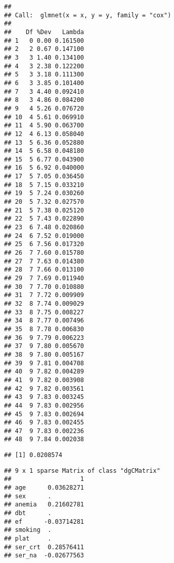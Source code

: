 \documentclass[
]{article}
\newenvironment{Shaded}{\begin{snugshade}}{\end{snugshade}}
\newcommand{\AttributeTok}[1]{\textcolor[rgb]{0.77,0.63,0.00}{#1}}
\newcommand{\FunctionTok}[1]{\textcolor[rgb]{0.00,0.00,0.00}{#1}}
\newcommand{\NormalTok}[1]{#1}
\newcommand{\SpecialCharTok}[1]{\textcolor[rgb]{0.00,0.00,0.00}{#1}}
\begin{document}
\begin{verbatim}
## 
## Call:  glmnet(x = x, y = y, family = "cox") 
## 
##    Df %Dev   Lambda
## 1   0 0.00 0.161500
## 2   2 0.67 0.147100
## 3   3 1.40 0.134100
## 4   3 2.38 0.122200
## 5   3 3.18 0.111300
## 6   3 3.85 0.101400
## 7   3 4.40 0.092410
## 8   3 4.86 0.084200
## 9   4 5.26 0.076720
## 10  4 5.61 0.069910
## 11  4 5.90 0.063700
## 12  4 6.13 0.058040
## 13  5 6.36 0.052880
## 14  5 6.58 0.048180
## 15  5 6.77 0.043900
## 16  5 6.92 0.040000
## 17  5 7.05 0.036450
## 18  5 7.15 0.033210
## 19  5 7.24 0.030260
## 20  5 7.32 0.027570
## 21  5 7.38 0.025120
## 22  5 7.43 0.022890
## 23  6 7.48 0.020860
## 24  6 7.52 0.019000
## 25  6 7.56 0.017320
## 26  7 7.60 0.015780
## 27  7 7.63 0.014380
## 28  7 7.66 0.013100
## 29  7 7.69 0.011940
## 30  7 7.70 0.010880
## 31  7 7.72 0.009909
## 32  8 7.74 0.009029
## 33  8 7.75 0.008227
## 34  8 7.77 0.007496
## 35  8 7.78 0.006830
## 36  9 7.79 0.006223
## 37  9 7.80 0.005670
## 38  9 7.80 0.005167
## 39  9 7.81 0.004708
## 40  9 7.82 0.004289
## 41  9 7.82 0.003908
## 42  9 7.82 0.003561
## 43  9 7.83 0.003245
## 44  9 7.83 0.002956
## 45  9 7.83 0.002694
## 46  9 7.83 0.002455
## 47  9 7.83 0.002236
## 48  9 7.84 0.002038
\end{verbatim}

\begin{Shaded}
\end{Shaded}

\begin{verbatim}
## [1] 0.0208574
\end{verbatim}

\begin{Shaded}
\end{Shaded}

\begin{verbatim}
## 9 x 1 sparse Matrix of class "dgCMatrix"
##                   1
## age      0.03628271
## sex      .         
## anemia   0.21602781
## dbt      .         
## ef      -0.03714281
## smoking  .         
## plat     .         
## ser_crt  0.28576411
## ser_na  -0.02677563
\end{verbatim}
\end{document}
